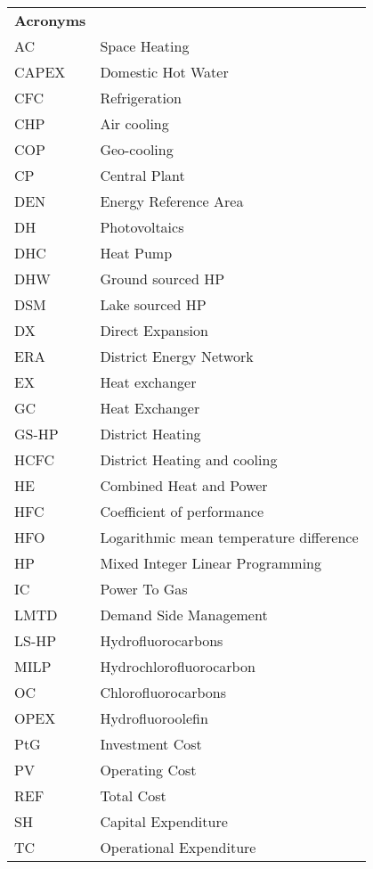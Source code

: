 \begin{table}[thp!]
	\centering
	\begin{tabular}{ll}
		\textbf{Acronyms} & \\
		AC & Space Heating \\
		CAPEX & Domestic Hot Water \\
		CFC & Refrigeration \\
		CHP & Air cooling \\
		COP & Geo-cooling \\
		CP & Central Plant \\
		DEN & Energy Reference Area \\
		DH & Photovoltaics \\
		DHC & Heat Pump \\
		DHW & Ground sourced HP \\
		DSM & Lake sourced HP \\
		DX & Direct Expansion \\
		ERA & District Energy Network \\
		EX & Heat exchanger \\
		GC & Heat Exchanger \\
		GS-HP & District Heating \\
		HCFC & District Heating and cooling \\
		HE & Combined Heat and Power \\
		HFC & Coefficient of performance \\
		HFO & Logarithmic mean temperature difference \\
		HP & Mixed Integer Linear Programming \\
		IC & Power To Gas \\
		LMTD & Demand Side Management \\
		LS-HP & Hydrofluorocarbons \\
		MILP & Hydrochlorofluorocarbon \\
		OC & Chlorofluorocarbons \\
		OPEX & Hydrofluoroolefin \\
		PtG & Investment Cost \\
		PV & Operating Cost \\
		REF & Total Cost \\
		SH & Capital Expenditure \\
		TC & Operational Expenditure \\

\end{tabular}
\end{table}

